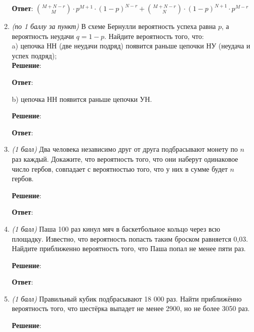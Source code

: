 \documentclass{article}
\begin{document}
\begin{enumerate}
    \textbf{Ответ}:
    $\binom{M+N-r}{M} \cdot p^{M+1} \cdot (1-p)^{N-r} + \binom{M+N-r}{N} \cdot (1-p)^{N+1} \cdot p^{M-r}$
    
    \item \textit{(по 1 баллу за пункт)}  В схеме Бернулли вероятность успеха равна $p$, а вероятность неудачи $q = 1-p$. Найдите вероятность того, что:\\
    a) цепочка НН (две неудачи подряд) появится раньше цепочки НУ (неудача и успех подряд);\\

    \textbf{Решение}:





    \textbf{Ответ}:

    b) цепочка НН появится раньше цепочки УН.

    \textbf{Решение}:





    \textbf{Ответ}:
    
    \item \textit{(1 балл)} Два человека независимо друг от друга подбрасывают монету по $n$ раз каждый. Докажите, что вероятность того, что они наберут одинаковое число гербов, совпадает с вероятностью того, что у них в сумме будет $n$ гербов.
    

    \textbf{Решение}:





    \textbf{Ответ}:
    
    \item \textit{(1 балл)} Паша 100 раз кинул мяч в баскетбольное кольцо через всю площадку. Известно, что вероятность попасть таким броском равняется 0,03. Найдите приближенно вероятность того, что Паша попал не менее пяти раз.
    

    \textbf{Решение}:





    \textbf{Ответ}:
    
    \item \textit{(1 балл)} Правильный кубик подбрасывают 18 000 раз. Найти приближённо вероятность того, что шестёрка выпадет не менее 2900, но не более 3050 раз.
    

    \textbf{Решение}:


\end{enumerate}
\end{document}

